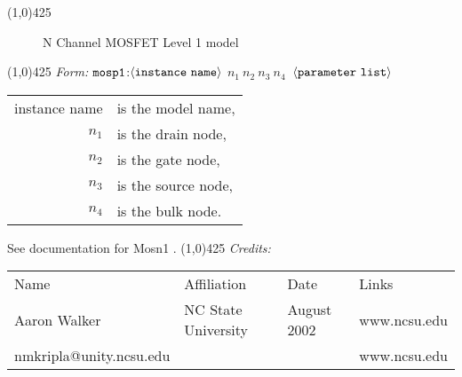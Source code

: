 \documentclass{article}
\newcommand{\FDA}{FreeDa}
\begin{document}
{}
\linethickness{1mm}
\line(1,0){425}
\normalsize
\begin{figure}[h]
\centerline{\epsfxsize=4in} \caption{N Channel MOSFET
Level 1 model}
\end{figure}
\linethickness{0.5mm} \line(1,0){425}
\newline
\textit{Form:}
\newline
$\tt mosp1$:$\langle \tt{instance\ name}\rangle$ $n_1\ n_2\ n_3\
n_4\ $ $\langle \tt{parameter\ list}\rangle$
\newline
\begin{tabular}{r l}
instance name & is the model name, \\
$n_1$ & is the drain node, \\
$n_2$ & is the gate node, \\
$n_3$ & is the source node, \\
$n_4$ & is the bulk node. \\
\end{tabular}
\newline
See documentation for Mosn1 .\newline
\linethickness{0.5mm} \line(1,0){425}
\newline
\textit{Credits:}\\
\begin{tabular}{l l l l}
Name & Affiliation & Date & Links \\
Aaron Walker & NC State University & August 2002 & www.ncsu.edu \\
nmkripla@unity.ncsu.edu & & & www.ncsu.edu
\end{tabular}
\end{document}
